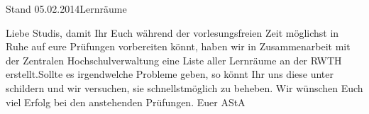 \documentclass[10pt]{article}
\begin{document}

\newcommand{\mr}[2]{\multirow{-3}{*}{\parbox{#1}{\centering \hspace*{-.75ex} #2}}}

\begin{vorderseite}{Stand 05.02.2014}{Lernr\"aume} %
\vspace{-1.5ex}
\begin{artikel}{\large Liebe Studis,}
\vspace{-2.0ex} {damit Ihr Euch w\"ahrend der vorlesungsfreien Zeit m\"oglichst in Ruhe auf eure Pr\"ufungen vorbereiten k\"onnt, haben wir in Zusammenarbeit mit der Zentralen Hochschulverwaltung eine Liste aller Lernr\"aume an der RWTH erstellt.Sollte es irgendwelche Probleme geben, so k\"onnt Ihr uns diese unter  schildern und wir versuchen, sie schnellstm\"oglich zu beheben.\newline
\vspace{.2ex}\noindent
Wir w\"unschen Euch viel Erfolg bei den anstehenden Pr\"ufungen.\newline
\vspace{.2ex}\noindent
Euer AStA}
\end{artikel}
\vspace{-5ex}
{
\centering

}
\vspace{-6ex}
\end{vorderseite}
\end{document}
